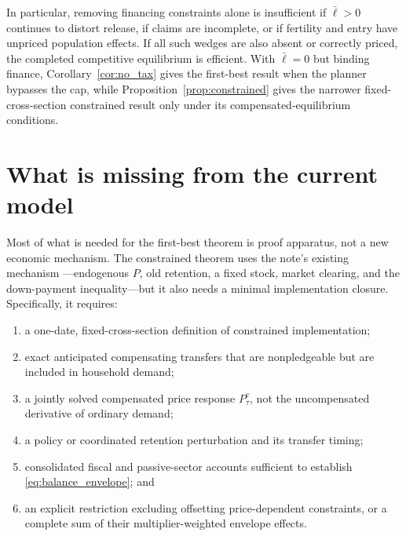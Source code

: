 \documentclass[11pt]{article}
\newcommand{\1}{\mathbf 1}
\newcommand{\ellbar}{\bar\ell}
\begin{document}
In particular, removing financing constraints alone is insufficient if
$\ellbar>0$ continues to distort release, if claims are incomplete, or if
fertility and entry have unpriced population effects. If all such wedges are
also absent or correctly priced, the completed competitive equilibrium is
efficient. With $\ellbar=0$ but binding finance, Corollary~\ref{cor:no_tax}
gives the first-best result when the planner bypasses the cap, while
Proposition~\ref{prop:constrained} gives the narrower fixed-cross-section
constrained result only under its compensated-equilibrium conditions.

\section{What is missing from the current model}
\label{sec:missing}

Most of what is needed for the first-best theorem is proof apparatus, not a new
economic mechanism. The constrained theorem uses the note's existing mechanism
---endogenous $P$, old retention, a fixed stock, market clearing, and the
down-payment inequality---but it also needs a minimal implementation closure.
Specifically, it requires:
\begin{enumerate}
\item a one-date, fixed-cross-section definition of constrained implementation;
\item exact anticipated compensating transfers that are nonpledgeable but are
included in household demand;
\item a jointly solved compensated price response $P_\tau^c$, not the
uncompensated derivative of ordinary demand;
\item a policy or coordinated retention perturbation and its transfer timing;
\item consolidated fiscal and passive-sector accounts sufficient to establish
\eqref{eq:balance_envelope}; and
\item an explicit restriction excluding offsetting price-dependent constraints,
or a complete sum of their multiplier-weighted envelope effects.
\end{enumerate}
\end{document}
